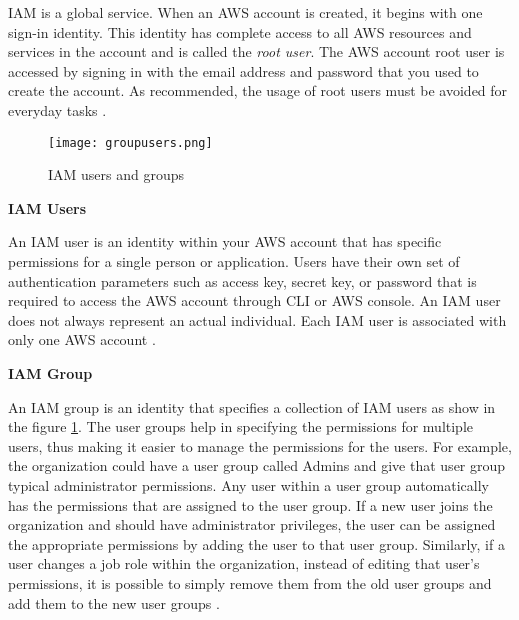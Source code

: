 \par IAM is a global service. When an AWS account is created, it begins with one sign-in identity. This identity has
complete access to all AWS resources and services in the account and is called the \textit{root user}. The AWS account root
user is accessed by signing in with the email address and password that you used to create the account. As
recommended, the usage of root users must be avoided for everyday tasks \cite{24}.

\begin{figure}
    \centering
    \texttt{[image: groupusers.png]}
    \caption{IAM users and groups}
    \label{fig:groupusers}
\end{figure}

\textbf{IAM Users}

\par An IAM user is an identity within your AWS account that has specific permissions for a single person or application. Users have their own set of authentication parameters such as access key, secret key, or password that is required to access the AWS account through CLI or AWS console. An IAM user does not always represent an actual individual. Each IAM user is associated with only one AWS account \cite{25}.


\textbf{IAM Group}
\par An IAM group is an identity that specifies a collection of IAM users as show in the figure \ref{fig:groupusers}. The user
groups help in specifying the permissions for multiple users, thus making it easier to manage the permissions for the
users. For example, the organization could have a user group called Admins and give that user group typical
administrator permissions. Any user within a user group automatically has the permissions that are assigned to the
user group.
If a new user joins the organization and should have administrator privileges, the user can be assigned the
appropriate permissions by adding the user to that user group. Similarly, if a user changes a job role within the
organization, instead of editing that user's permissions, it is possible to simply remove them from the old user groups
and add them to the new user groups \cite{25}.



